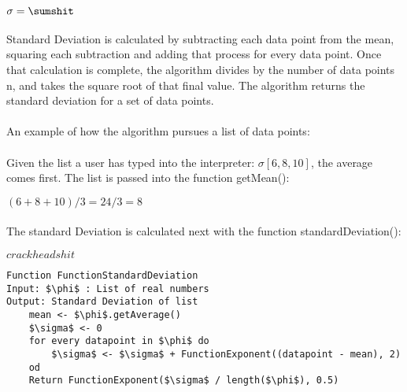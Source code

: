 \begin{itemize}
            \begin{center}
                $\sigma = \sumshit$
            \end{center}

            \paragraph{}
            Standard Deviation is calculated by subtracting each data point from the mean, squaring each subtraction and adding that process for every data point. Once that calculation is complete, the algorithm divides by the number of data points n, and takes the square root of that final value. The algorithm returns the standard deviation for a set of data points.

            \paragraph{}
            An example of how the algorithm pursues a list of data points:

            \paragraph{}
            Given the list a user has typed into the interpreter: $\sigma[6, 8, 10]$, the average comes first. The list is passed into the function getMean():

            \begin{center}
                $(6 + 8 + 10)/3 = 24/3 = 8$
            \end{center}

            \paragraph{}
            The standard Deviation is calculated next with the function standardDeviation():
            \begin{center}
                $crackheadshit$
            \end{center}

            \begin{lstlisting}
Function FunctionStandardDeviation
Input: $\phi$ : List of real numbers
Output: Standard Deviation of list
    mean <- $\phi$.getAverage()
    $\sigma$ <- 0
    for every datapoint in $\phi$ do
    	$\sigma$ <- $\sigma$ + FunctionExponent((datapoint - mean), 2)
    od
    Return FunctionExponent($\sigma$ / length($\phi$), 0.5)
            \end{lstlisting}


\end{itemize}
